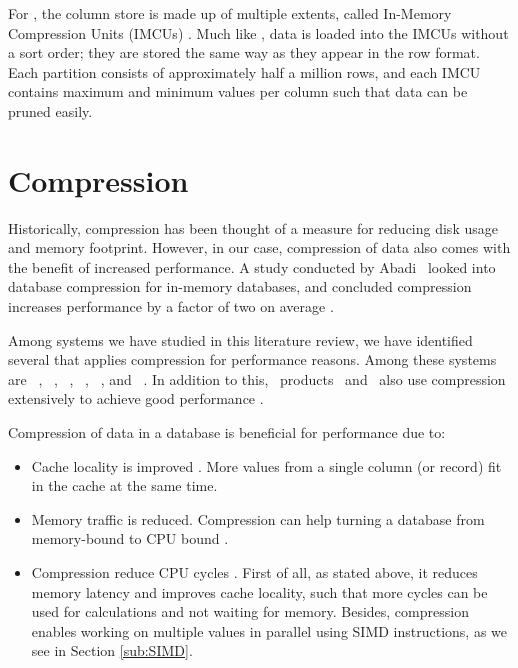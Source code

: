 For \oracle, the column store is made up of multiple extents, called In-Memory Compression Units (IMCUs) \cite{Lahiri2015-mz}. Much like \mssql, data is loaded into the IMCUs without a sort order; they are stored the same way as they appear in the row format. Each partition consists of approximately half a million rows, and each IMCU contains maximum and minimum values per column such that data can be pruned easily. 

\section{Compression}
\label{sec:Compression}
Historically, compression has been thought of a measure for reducing disk usage and memory footprint. However, in our case, compression of data also comes with the benefit of increased performance. A study conducted by Abadi \ea~looked into database compression for in-memory databases, and concluded compression increases performance by a factor of two on average \cite{Abadi2008-dd}.

Among systems we have studied in this literature review, we have identified several that applies compression for performance reasons. Among these systems are \ibm~\cite{Raman2013-em}, \cstore~\cite{Stonebraker2005-qz}, \vertica~\cite{Lamb2012-kg}, \oracle~\cite{Oracle2015-fs}, \gorilla~\cite{Pelkonen2015-ko}, and \exasol~\cite{Exasol2014-xh}. In addition to this, \bd~products \tableau~and \qlikview~also use compression extensively to achieve good performance \cite{Kamkolkar2015-iq, Qlik2014-vd}. 

Compression of data in a database is beneficial for performance due to:
\begin{itemize}
  \item Cache locality is improved \cite{Exasol2014-xh}. More values from a single column (or record) fit in the cache at the same time.
  \item Memory traffic is reduced. Compression can help turning a database from memory-bound to CPU bound \cite{Willhalm2009-hu}.
  \item Compression reduce CPU cycles \cite{Stonebraker2005-qz}. First of all, as stated above, it reduces memory latency and improves cache locality, such that more cycles can be used for calculations and not waiting for memory. Besides, compression enables working on multiple values in parallel using SIMD instructions, as we see in Section \ref{sub:SIMD}.
\end{itemize}

